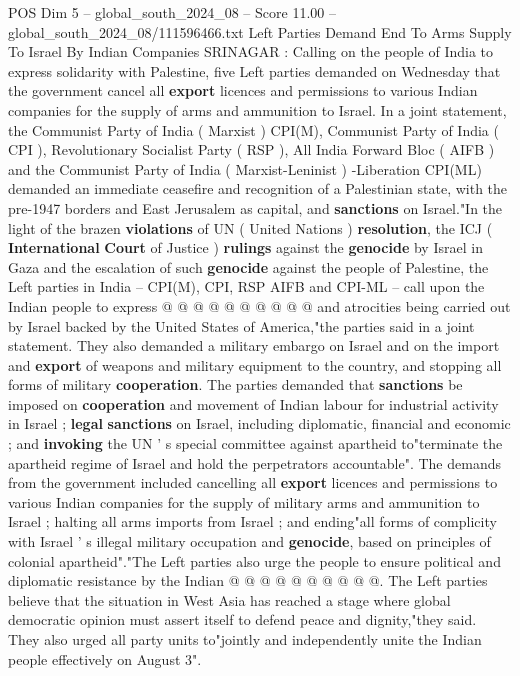 \begin{textsample}{POS Dim 5 – global\_south\_2024\_08 – Score 11.00 – global\_south\_2024\_08/111596466.txt}  \label{ex:f5_pos_288}
Left Parties Demand End To Arms Supply To Israel By Indian Companies SRINAGAR : Calling on the people of India to express solidarity with Palestine, five Left parties demanded on Wednesday that the government cancel all \textbf{export} licences and permissions to various Indian companies for the supply of arms and ammunition to Israel.
In a joint statement, the Communist Party of India ( Marxist ) CPI(M), Communist Party of India ( CPI ), Revolutionary Socialist Party ( RSP ), All India Forward Bloc ( AIFB ) and the Communist Party of India ( Marxist-Leninist ) -Liberation CPI(ML) demanded an immediate ceasefire and recognition of a Palestinian state, with the pre-1947 borders and East Jerusalem as capital, and \textbf{sanctions} on Israel."In the light of the brazen \textbf{violations} of UN ( United Nations ) \textbf{resolution}, the ICJ ( \textbf{International} \textbf{Court} of Justice ) \textbf{rulings} against the \textbf{genocide} by Israel in Gaza and the escalation of such \textbf{genocide} against the people of Palestine, the Left parties in India -- CPI(M), CPI, RSP AIFB and CPI-ML -- call upon the Indian people to express @ @ @ @ @ @ @ @ @ @ and atrocities being carried out by Israel backed by the United States of America,"the parties said in a joint statement.
They also demanded a military embargo on Israel and on the import and \textbf{export} of weapons and military equipment to the country, and stopping all forms of military \textbf{cooperation}.
The parties demanded that \textbf{sanctions} be imposed on \textbf{cooperation} and movement of Indian labour for industrial activity in Israel ; \textbf{legal} \textbf{sanctions} on Israel, including diplomatic, financial and economic ; and \textbf{invoking} the UN ' s special committee against apartheid to"terminate the apartheid regime of Israel and hold the perpetrators accountable".
The demands from the government included cancelling all \textbf{export} licences and permissions to various Indian companies for the supply of military arms and ammunition to Israel ; halting all arms imports from Israel ; and ending"all forms of complicity with Israel ' s illegal military occupation and \textbf{genocide}, based on principles of colonial apartheid"."The Left parties also urge the people to ensure political and diplomatic resistance by the Indian @ @ @ @ @ @ @ @ @ @.
The Left parties believe that the situation in West Asia has reached a stage where global democratic opinion must assert itself to defend peace and dignity,"they said.
They also urged all party units to"jointly and independently unite the Indian people effectively on August 3".

\end{textsample}

